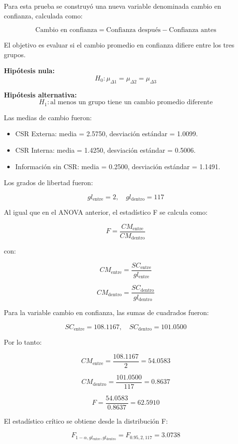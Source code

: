 \documentclass[12pt,letterpaper]{article}
\begin{document}
Para esta prueba se construyó una nueva variable denominada cambio en confianza, calculada como:

\[
\text{Cambio en confianza} = \text{Confianza después} - \text{Confianza antes}
\]

El objetivo es evaluar si el cambio promedio en confianza difiere entre los tres grupos.

\textbf{Hipótesis nula:}
\[
H_0: \mu_{\Delta 1} = \mu_{\Delta 2} = \mu_{\Delta 3}
\]

\textbf{Hipótesis alternativa:}
\[
H_1: \text{al menos un grupo tiene un cambio promedio diferente}
\]

Las medias de cambio fueron:

\begin{itemize}
    \item CSR Externa: media = 2.5750, desviación estándar = 1.0099.
    \item CSR Interna: media = 1.4250, desviación estándar = 0.5006.
    \item Información sin CSR: media = 0.2500, desviación estándar = 1.1491.
\end{itemize}

Los grados de libertad fueron:

\[
gl_{\text{entre}} = 2,\quad gl_{\text{dentro}} = 117
\]

Al igual que en el ANOVA anterior, el estadístico F se calcula como:

\[
F =
\frac{CM_{\text{entre}}}{CM_{\text{dentro}}}
\]

con:

\[
CM_{\text{entre}} =
\frac{SC_{\text{entre}}}{gl_{\text{entre}}}
\]

\[
CM_{\text{dentro}} =
\frac{SC_{\text{dentro}}}{gl_{\text{dentro}}}
\]

Para la variable cambio en confianza, las sumas de cuadrados fueron:

\[
SC_{\text{entre}} = 108.1167,\quad
SC_{\text{dentro}} = 101.0500
\]

Por lo tanto:

\[
CM_{\text{entre}} =
\frac{108.1167}{2}
= 54.0583
\]

\[
CM_{\text{dentro}} =
\frac{101.0500}{117}
= 0.8637
\]

\[
F =
\frac{54.0583}{0.8637}
= 62.5910
\]

El estadístico crítico se obtiene desde la distribución F:

\[
F_{1-\alpha,gl_{\text{entre}},gl_{\text{dentro}}}
=
F_{0.95,2,117}
= 3.0738
\]
\end{document}
